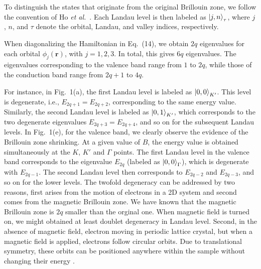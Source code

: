 \documentclass{article}
\begin{document}
To distinguish the states that originate from the original Brillouin zone, we follow the convention of Ho \textit{et al.}~\cite{ho2014}. Each Landau level is then labeled as $\ket{j, n}_{\tau}$, where $j$, $n$, and $\tau$ denote the orbital, Landau, and valley indices, respectively.

When diagonalizing the Hamiltonian in Eq.~(14), we obtain $2q$ eigenvalues for each orbital $\phi_{j}(\mathbf{r})$, with $j = 1,2,3$. In total, this gives $6q$ eigenvalues. The eigenvalues corresponding to the valence band range from $1$ to $2q$, while those of the conduction band range from $2q+1$ to $4q$.

For instance, in Fig.~1(a), the first Landau level is labeled as $\ket{0,0}_{K'}$. This level is degenerate, i.e., $E_{2q+1} = E_{2q+2}$, corresponding to the same energy value. Similarly, the second Landau level is labeled as $\ket{0,1}_{K'}$, which corresponds to the two degenerate eigenvalues $E_{2q+3} = E_{2q+4}$, and so on for the subsequent Landau levels. In Fig.~1(e), for the valence band, we clearly observe the evidence of the Brillouin zone shrinking. At a given value of $B$, the energy value is obtained simultaneously at the $K$, $K'$ and $\Gamma$ points. The first Landau level in the valence band corresponds to the eigenvalue $E_{2q}$ (labeled as $\ket{0,0}_{\Gamma}$), which is degenerate with $E_{2q-1}$. The second Landau level then corresponds to $E_{2q-2}$ and $E_{2q-3}$, and so on for the lower levels. The twofold degeneracy can be addressed by two reasons, first arises from the motion of electrons in a 2D system and second comes from the magnetic Brillouin zone.
We have known that the magnetic Brillouin zone is $2q$ smaller than the orginal one. When magnetic field is turned on, we might obtained at least doublet degeneracy in Landau level. Second, in the absence of magnetic field, electron moving in periodic lattice crystal, but when a magnetic field is applied, electrons follow circular orbits. Due to translational symmetry, these orbits can be positioned anywhere within the sample without changing their energy \cite{kittel2018}. 
\end{document}
